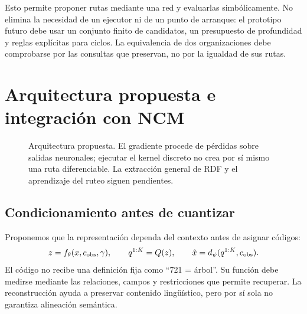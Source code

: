 \documentclass[11pt,a4paper]{article}
\begin{document}
Esto permite proponer rutas mediante una red y evaluarlas simbólicamente. No
elimina la necesidad de un ejecutor ni de un punto de arranque: el prototipo
futuro debe usar un conjunto finito de candidatos, un presupuesto de profundidad
y reglas explícitas para ciclos. La equivalencia de dos organizaciones debe
comprobarse por las consultas que preservan, no por la igualdad de sus rutas.

\section{Arquitectura propuesta e integración con NCM}
\begin{figure}[t]
\centering
{}
\caption{Arquitectura propuesta. El gradiente procede de pérdidas sobre salidas
neuronales; ejecutar el kernel discreto no crea por sí mismo una ruta diferenciable.
La extracción general de RDF y el aprendizaje del ruteo siguen pendientes.}
\end{figure}

\subsection{Condicionamiento antes de cuantizar}
Proponemos que la representación dependa del contexto antes de asignar códigos:
\begin{equation}
 z=f_\theta(x,c_{\rm obs},\gamma),\qquad
 q^{1:K}=Q(z),\qquad \hat{x}=d_\psi(q^{1:K},c_{\rm obs}).
\end{equation}
El código no recibe una definición fija como ``721 = árbol''. Su función debe
medirse mediante las relaciones, campos y restricciones que permite recuperar.
La reconstrucción ayuda a preservar contenido lingüístico, pero por sí sola no
garantiza alineación semántica.
\end{document}

